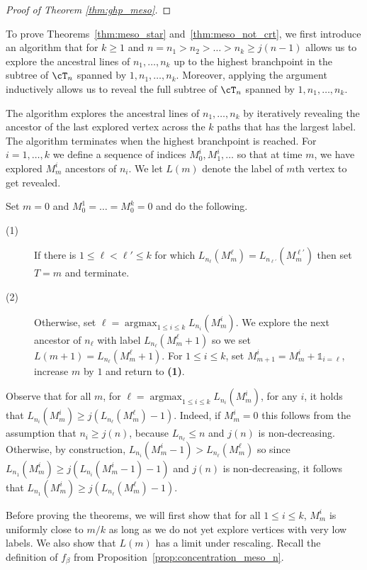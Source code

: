 \documentclass[letterpaper,11pt,reqno]{amsart}
\theoremstyle{definition}
\renewcommand{\le}{\leqslant}
\renewcommand{\ge}{\geqslant}
\newcommand{\ind}{\mathds{1}}
\DeclareMathOperator{\argmax}{argmax}
\begin{document}
{\begin{proof}[Proof of Theorem \ref{thm:ghp_meso}]
\end{proof}

To prove Theorems~\ref{thm:meso_star} and~\ref{thm:meso_not_crt}, we first introduce an algorithm that for $k\ge 1$ and $n=n_1>n_2>\dots> n_k\ge j(n-1)$ allows us to explore the ancestral lines of $n_1,\dots, n_k$ up to the highest branchpoint in the subtree of $\cT_n$ spanned by $1,n_1,\dots, n_k$. Moreover, applying the argument inductively allows us to reveal the full subtree of  $\cT_n$ spanned by $1,n_1,\dots, n_k$. 

The algorithm explores the ancestral lines of $n_1,\dots, n_k$ by iteratively revealing the ancestor of the last explored vertex across the $k$ paths that has the largest label. The algorithm terminates when the highest branchpoint is reached. For $i=1,\dots, k$ we define a sequence of indices $M^i_0,M^i_1,\dots$ so that at time $m$, we have explored $M^i_m$ ancestors of $n_i$. We let $L(m)$ denote the label of $m$th vertex to get revealed.

Set $m=0$ and $M^1_0=\dots=M^k_0=0$ and do the following.
\begin{description}
    \item[(1)] If there is $1\le \ell<\ell'\le k$ for which $L_{n_\ell}(M^\ell_{m})=L_{n_{\ell'}}(M^{\ell'}_m)$ then set $T=m$ and terminate.  
    \item[(2)] Otherwise, set $\ell=\argmax_{1\le i\le k}L_{n_i}(M^i_m)$.  We explore the next ancestor of $n_\ell$ with label $L_{n_\ell}(M^\ell_m+1)$ so we set $L(m+1)=L_{n_\ell}(M^\ell_m+1)$. For $1\le i \le k$, set $M^i_{m+1}=M^i_{m}+\ind_{i=\ell}$, increase $m$ by $1$ and return to {\bf (1)}.
   \end{description}
   
Observe that for all $m$, for $\ell=\argmax_{1\le i \le k} L_{n_i}(M^i_m)$, for any $i$, it holds that $L_{n_i}(M^i_m)\ge j(L_{n_\ell}(M^\ell_m)-1)$. Indeed, if $M^i_m=0$ this follows from the assumption that $n_i\ge j(n)$, because $L_{n_\ell}\le n$ and $j(n)$ is non-decreasing.  Otherwise, by construction, $L_{n_i}(M^i_m-1)>L_{n_\ell}(M^\ell_m)$ so since $L_{n_1}(M^i_m)\ge j(L_{n_i}(M^i_m-1)-1)$ and $j(n)$ is non-decreasing, it follows that $L_{n_1}(M^i_m)\ge j(L_{n_\ell}(M^\ell_m)-1)$.

Before proving the theorems, we will first show that for all $1\le i \le k$, $M^i_m$ is uniformly close to $m/k$ as long as we do not yet explore vertices with very low labels. We also show that $L(m)$ has a limit under rescaling. Recall the definition of $f_\beta$ from Proposition~\ref{prop:concentration_meso_n}. 

}
\end{document}
